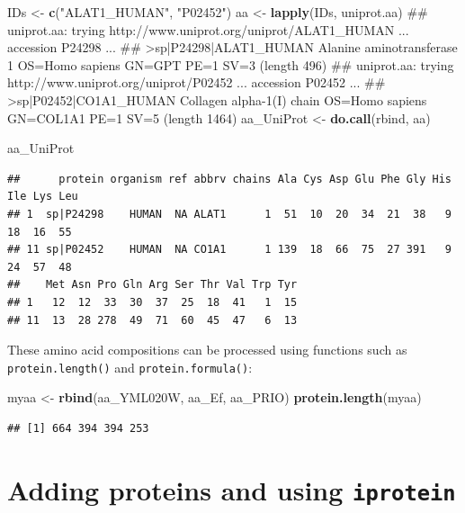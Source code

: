 \documentclass[]{tufte-book}
\newenvironment{Shaded}{}{}
\newcommand{\KeywordTok}[1]{\textcolor[rgb]{0.00,0.44,0.13}{\textbf{#1}}}
\newcommand{\StringTok}[1]{\textcolor[rgb]{0.25,0.44,0.63}{#1}}
\newcommand{\NormalTok}[1]{#1}
\begin{document}
\begin{Shaded}
\begin{Highlighting}[]
\NormalTok{IDs <-}\StringTok{ }\KeywordTok{c}\NormalTok{(}\StringTok{"ALAT1_HUMAN"}\NormalTok{, }\StringTok{"P02452"}\NormalTok{)}
\NormalTok{aa <-}\StringTok{ }\KeywordTok{lapply}\NormalTok{(IDs, uniprot.aa)}
\NormalTok{## uniprot.aa: trying http://www.uniprot.org/uniprot/ALAT1_HUMAN ... accession P24298 ...}
\NormalTok{## >sp|P24298|ALAT1_HUMAN Alanine aminotransferase 1 OS=Homo sapiens GN=GPT PE=1 SV=3 (length 496)}
\NormalTok{## uniprot.aa: trying http://www.uniprot.org/uniprot/P02452 ... accession P02452 ...}
\NormalTok{## >sp|P02452|CO1A1_HUMAN Collagen alpha-1(I) chain OS=Homo sapiens GN=COL1A1 PE=1 SV=5 (length 1464)}
\NormalTok{aa_UniProt <-}\StringTok{ }\KeywordTok{do.call}\NormalTok{(rbind, aa)}
\end{Highlighting}
\end{Shaded}

\begin{Shaded}
\begin{Highlighting}[]
\NormalTok{aa_UniProt}
\end{Highlighting}
\end{Shaded}

\begin{verbatim}
##      protein organism ref abbrv chains Ala Cys Asp Glu Phe Gly His Ile Lys Leu
## 1  sp|P24298    HUMAN  NA ALAT1      1  51  10  20  34  21  38   9  18  16  55
## 11 sp|P02452    HUMAN  NA CO1A1      1 139  18  66  75  27 391   9  24  57  48
##    Met Asn Pro Gln Arg Ser Thr Val Trp Tyr
## 1   12  12  33  30  37  25  18  41   1  15
## 11  13  28 278  49  71  60  45  47   6  13
\end{verbatim}

These amino acid compositions can be processed using functions such as
{\texttt{protein.length()}} and {\texttt{protein.formula()}}:

\begin{Shaded}
\begin{Highlighting}[]
\NormalTok{myaa <-}\StringTok{ }\KeywordTok{rbind}\NormalTok{(aa_YML020W, aa_Ef, aa_PRIO)}
\KeywordTok{protein.length}\NormalTok{(myaa)}
\end{Highlighting}
\end{Shaded}

\begin{verbatim}
## [1] 664 394 394 253
\end{verbatim}

\section{\texorpdfstring{Adding proteins and using
\texttt{iprotein}}{Adding proteins and using iprotein}}\label{adding-proteins-and-using-iprotein}
\end{document}
